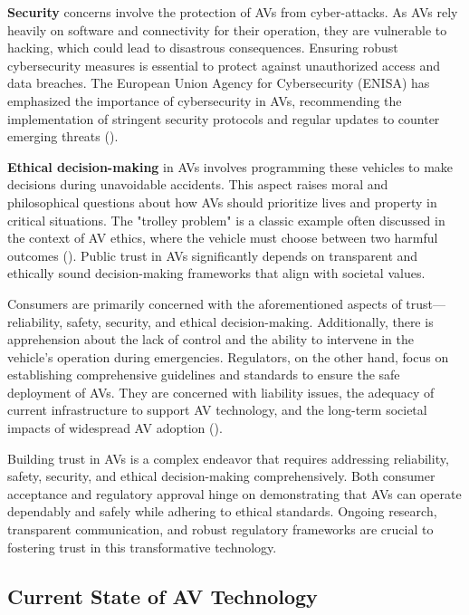 \textbf{Security} concerns involve the protection of AVs from cyber-attacks. As AVs rely heavily on software and connectivity for their operation, they are vulnerable to hacking, which could lead to disastrous consequences. Ensuring robust cybersecurity measures is essential to protect against unauthorized access and data breaches. The European Union Agency for Cybersecurity (ENISA) has emphasized the importance of cybersecurity in AVs, recommending the implementation of stringent security protocols and regular updates to counter emerging threats (\cite{enisa2020}).

\textbf{Ethical decision-making} in AVs involves programming these vehicles to make decisions during unavoidable accidents. This aspect raises moral and philosophical questions about how AVs should prioritize lives and property in critical situations. The "trolley problem" is a classic example often discussed in the context of AV ethics, where the vehicle must choose between two harmful outcomes (\cite{lin2016}). Public trust in AVs significantly depends on transparent and ethically sound decision-making frameworks that align with societal values.

Consumers are primarily concerned with the aforementioned aspects of trust—reliability, safety, security, and ethical decision-making. Additionally, there is apprehension about the lack of control and the ability to intervene in the vehicle’s operation during emergencies. Regulators, on the other hand, focus on establishing comprehensive guidelines and standards to ensure the safe deployment of AVs. They are concerned with liability issues, the adequacy of current infrastructure to support AV technology, and the long-term societal impacts of widespread AV adoption (\cite{litman2020}).

Building trust in AVs is a complex endeavor that requires addressing reliability, safety, security, and ethical decision-making comprehensively. Both consumer acceptance and regulatory approval hinge on demonstrating that AVs can operate dependably and safely while adhering to ethical standards. Ongoing research, transparent communication, and robust regulatory frameworks are crucial to fostering trust in this transformative technology.


\subsection{Current State of AV Technology}

